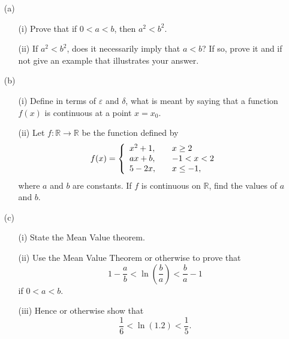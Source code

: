 \documentclass[12pt]{uz-exame}
\begin{document}
\begin{question}
\begin{itemize}
\item[(a)] \begin{itemize}
\item[(i)] Prove that if $0<a<b$, then $a^2<b^2$. 
\item[(ii)] If $a^2<b^2$, does it necessarily imply that $a<b$? If so, prove it and if not give an example that illustrates your answer. 
\end{itemize}
\item[(b)] \begin{itemize}
\item[(i)] Define in terms of $\varepsilon$ and $\delta$, what is meant by saying that a function $f(x)$ is continuous at a point $x=x_0$. 
\item[(ii)] Let $f:\mathbb{R}\to \mathbb{R}$  be the function defined by 
\[f(x) = \left\{ 
\begin{array}{l l}
  x^2+1, & \quad x \geq 2\\
  ax+b, & \quad -1 <x < 2\\
  5-2x, & \quad x \leq -1,\\ \end{array} \right. \]
  where $a$ and $b$ are constants. If $f$ is continuous on $\mathbb{R}$, find the values of $a$ and $b$. 
\end{itemize}
\item[(c)]\begin{itemize}
\item[(i)] State the Mean Value theorem. 
\item[(ii)] Use the Mean Value Theorem or otherwise to prove that 
\[1-\dfrac{a}{b}<\ln \left(\dfrac{b}{a}\right)<\dfrac{b}{a}-1\] if $0<a<b$. 
\item[(iii)] Hence or otherwise show that 
\[\dfrac{1}{6}<\ln (1.2)<\dfrac{1}{5}.\] 
\end{itemize}
\end{itemize}
\end{question}
\end{document}
